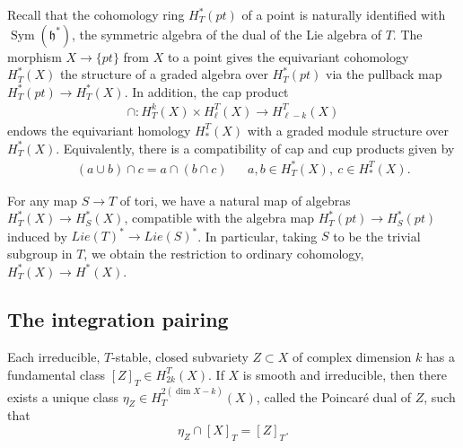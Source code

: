 \documentclass[10pt]{article}
\numberwithin{thm}{section}
\theoremstyle{definition}
\theoremstyle{remark}
\newcommand{\Hom}{\operatorname{Hom}}
\newcommand{\X}[1]{\ensuremath{\mathfrak X(#1)}}
\newcommand{\car}{\ensuremath{\mathfrak h}}
\newcommand{\IQ}{\mathbb Q}
\begin{document}
Recall that the cohomology ring $H^*_T(pt)$ of a point is naturally identified with 
$\operatorname{Sym}(\car^*)$, %
the symmetric algebra of the dual of the Lie algebra of $T$. 
The morphism $X \to \{pt\}$ from $X$ to a point
gives the equivariant cohomology $H^*_T(X)$ the structure
of a graded algebra over $H^*_T(pt)$ via the pullback map $H_T^*(pt)\to H_T^*(X)$.
In addition, the cap product
\begin{align*}
\cap: H^k_T(X)\times H_\ell^T(X)\to H_{\ell-k}^T(X)
\end{align*}
endows the
equivariant homology $H_*^T(X)$ with a graded module structure over $H^*_T(X)$. 
Equivalently, there is a compatibility of cap and cup products given by
\begin{align*}
&&(a \cup b) \cap c = a \cap (b \cap c)
&&a,b \in H^*_T(X),\ c \in H_*^T(X).
\end{align*} 

For any map $S\to T$ of tori, 
we have a natural map of algebras $H^*_T(X) \to H^*_S(X)$,
compatible with the algebra map $H^*_T(pt)\to H^*_S(pt)$ induced by $Lie(T)^*\to Lie(S)^*$.
In particular, taking $S$ to be the trivial subgroup in $T$,
we obtain the restriction to ordinary cohomology,
$
H^*_T(X)\to H^*(X)
$.


\subsection{The integration pairing}
\label{sec:pairing}
Each irreducible, $T$-stable, closed subvariety $Z \subset X$ of complex dimension 
$k$ has a fundamental class $[Z]_T \in H_{2k}^T(X)$. If $X$ is smooth and irreducible,
then there exists a unique class $\eta_Z \in H^{2 (\dim X - k)}_T(X)$,
called the Poincar{\'e} dual of $Z$,
such that \begin{equation*}\eta_Z \cap [X]_T = [Z]_T.\end{equation*}
\end{document}
